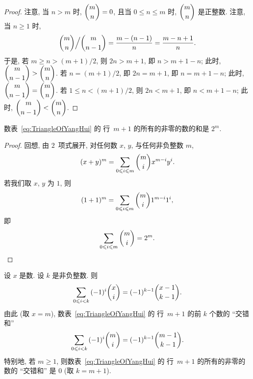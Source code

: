 \documentclass[../libro.tex]{subfiles}
\begin{document}
\begin{proof}
    注意, 当 \(n > m\) 时, \(\dbinom{m}{n} = 0\),
    且当 \(0 \leq n \leq m\) 时, \(\dbinom{m}{n}\) 是正整数.
    注意, 当 \(n \geq 1\) 时,
    \begin{align*}
        \dbinom{m}{n} \Big/ \dbinom{m}{n-1}
        = \frac{m - (n - 1)}{n}
        = \frac{m - n + 1}{n}.
    \end{align*}
    于是, 若 \(m \geq n > (m+1)/2\),
    则 \(2n > m + 1\),
    即 \(n > m + 1 - n\);
    此时, \(\dbinom{m}{n-1} > \dbinom{m}{n}\).
    若 \(n = (m+1)/2\),
    即 \(2n = m + 1\),
    即 \(n = m + 1 - n\);
    此时, \(\dbinom{m}{n-1} = \dbinom{m}{n}\).
    若 \(1 \leq n < (m+1)/2\),
    则 \(2n < m + 1\),
    即 \(n < m + 1 - n\);
    此时, \(\dbinom{m}{n-1} < \dbinom{m}{n}\).
\end{proof}

\begin{theorem}
    数表~\eqref{eq:TriangleOfYangHui} 的%
    行~\(m+1\) 的所有的非零的数的和是 \(2^m\).
\end{theorem}

\begin{proof}
    回想, 由 \(2\)~项式展开,
    对任何数 \(x\), \(y\), 与任何非负整数 \(m\),
    \begin{align*}
        (x + y)^m = \sum_{0 \leq i \leq m} {\dbinom{m}{i} x^{m-i} y^i}.
    \end{align*}
    若我们取 \(x\), \(y\) 为 \(1\), 则
    \begin{align*}
        (1 + 1)^m = \sum_{0 \leq i \leq m} {\dbinom{m}{i} 1^{m-i} 1^i},
    \end{align*}
    即
    \begin{equation*}
        \sum_{0 \leq i \leq m} {\dbinom{m}{i}} = 2^m.
        \qedhere
    \end{equation*}
\end{proof}

\begin{theorem}
    设 \(x\) 是数.
    设 \(k\) 是非负整数.
    则
    \begin{align*}
        \sum_{0 \leq i < k} {(-1)^i \dbinom{x}{i}}
        = (-1)^{k-1} \dbinom{x-1}{k-1}.
    \end{align*}
    由此 (取 \(x = m\)),
    数表~\eqref{eq:TriangleOfYangHui} 的%
    行~\(m+1\) 的前 \(k\) 个数的 ``交错和''
    \begin{align*}
        \sum_{0 \leq i < k} {(-1)^i \dbinom{m}{i}}
        = (-1)^{k-1} \dbinom{m-1}{k-1}.
    \end{align*}
    特别地, 若 \(m \geq 1\),
    则数表~\eqref{eq:TriangleOfYangHui} 的%
    行~\(m+1\) 的所有的非零的数的 ``交错和'' 是 \(0\)
    (取 \(k = m + 1\)).
\end{theorem}
\end{document}
